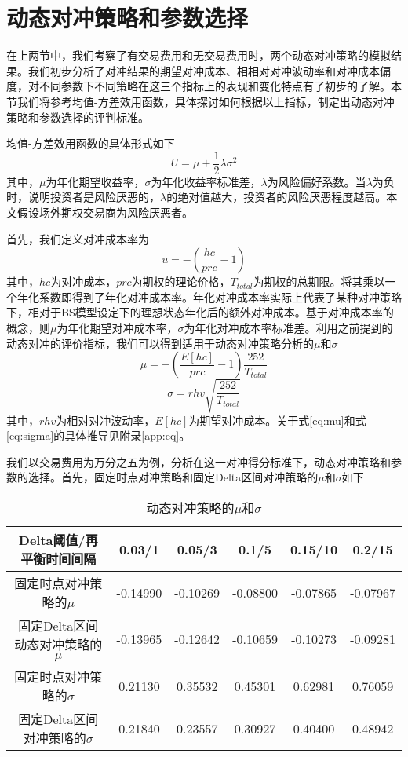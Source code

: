 \section{动态对冲策略和参数选择}
\label{utility}

在上两节中，我们考察了有交易费用和无交易费用时，两个动态对冲策略的模拟结果。我们初步分析了对冲结果的期望对冲成本、相相对对冲波动率和对冲成本偏度，对不同参数下不同策略在这三个指标上的表现和变化特点有了初步的了解。本节我们将参考均值-方差效用函数，具体探讨如何根据以上指标，制定出动态对冲策略和参数选择的评判标准。

均值-方差效用函数的具体形式如下
\begin{equation}
  U=\mu+\frac{1}{2}\lambda\sigma^2
\end{equation}
其中，$\mu$为年化期望收益率，$\sigma$为年化收益率标准差，$\lambda$为风险偏好系数。当$\lambda$为负时，说明投资者是风险厌恶的，$\lambda$的绝对值越大，投资者的风险厌恶程度越高。本文假设场外期权交易商为风险厌恶者。

首先，我们定义对冲成本率为
\begin{equation}
  u=-(\frac{hc}{prc}-1)
\end{equation}
其中，$hc$为对冲成本，$prc$为期权的理论价格，$T_{total}$为期权的总期限。将其乘以一个年化系数即得到了年化对冲成本率。年化对冲成本率实际上代表了某种对冲策略下，相对于BS模型设定下的理想状态年化后的额外对冲成本。基于对冲成本率的概念，则$\mu$为年化期望对冲成本率，$\sigma$为年化对冲成本率标准差。利用之前提到的动态对冲的评价指标，我们可以得到适用于动态对冲策略分析的$\mu$和$\sigma$
\begin{equation}
  \mu=-(\frac{E[hc]}{prc}-1)\frac{252}{T_{total}}
  \label{eq:mu}
\end{equation}
\begin{equation}
  \sigma=rhv\sqrt{\frac{252}{T_{total}}}
  \label{eq:sigma}
\end{equation}
其中，$rhv$为相对对冲波动率，$E[hc]$为期望对冲成本。关于式\ref{eq:mu}和式\ref{eq:sigma}的具体推导见附录\ref{app:eq}。

我们以交易费用为万分之五为例，分析在这一对冲得分标准下，动态对冲策略和参数的选择。首先，固定时点对冲策略和固定Delta区间对冲策略的$\mu$和$\sigma$如下

\begin{table}[htbp]
  \centering
  \caption{动态对冲策略的$\mu$和$\sigma$}
  \label{tab:compare_two_0}
  \begin{tabular}{cccccc}
    \toprule
    Delta阈值/再平衡时间间隔 & 0.03/1 & 0.05/3 & 0.1/5 & 0.15/10 & 0.2/15 \\
    \midrule
    固定时点对冲策略的$\mu$ & -0.14990 & -0.10269 & -0.08800 & -0.07865 & -0.07967 \\
    固定Delta区间动态对冲策略的$\mu$ & -0.13965 & -0.12642 & -0.10659 & -0.10273 & -0.09281 \\
    固定时点对冲策略的$\sigma$ & 0.21130 & 0.35532 & 0.45301 & 0.62981 & 0.76059 \\
    固定Delta区间对冲策略的$\sigma$ & 0.21840 & 0.23557 & 0.30927 & 0.40400 & 0.48942 \\
    \bottomrule
  \end{tabular}
\end{table}

